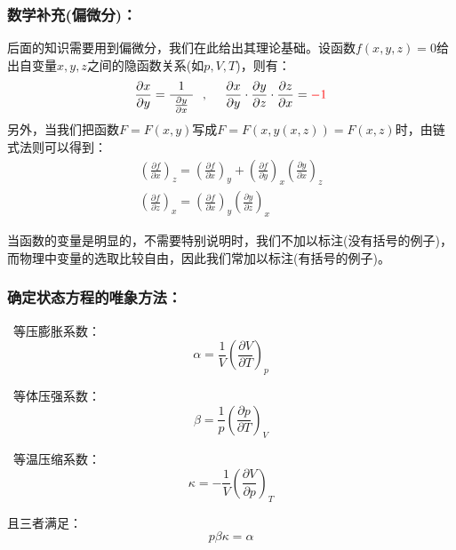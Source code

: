 \documentclass[zihao=5,UTF8]{report}
\begin{document}
\subsubsection{数学补充(偏微分)：}
后面的知识需要用到偏微分，我们在此给出其理论基础。设函数$f(x,y,z) = 0$给出自变量$x,y,z$之间的隐函数关系(如$p,V,T$)，则有：
\begin{align*}
    \frac{\partial x}{\partial y} = \frac{1}{\ \frac{\partial y}{\partial x} \ }\ \  ,\ \ \ \ 
    \frac{\partial x}{\partial y}\cdot \frac{\partial y}{\partial z}\cdot \frac{\partial z}{\partial x} = {\textcolor{red}{-1}}
\end{align*}
另外，当我们把函数$F = F(x,y)$写成$F = F(x,y(x,z)) = F(x,z)$时，由链式法则可以得到：
\begin{gather}
    \left(\frac{\partial f}{\partial x}\right)_z = \left(\frac{\partial f}{\partial x}\right)_y + \left(\frac{\partial f}{\partial y}\right)_x \left(\frac{\partial y}{\partial x}\right)_z \\
    \left(\frac{\partial f}{\partial z}\right)_x = \left(\frac{\partial f}{\partial x}\right)_y\left(\frac{\partial y}{\partial z}\right)_x
\end{gather}\par
{\color{gray}\small 当函数的变量是明显的，不需要特别说明时，我们不加以标注(没有括号的例子)，而物理中变量的选取比较自由，因此我们常加以标注(有括号的例子)。}
\subsubsection{确定状态方程的唯象方法：}
\ 等压膨胀系数：
\begin{equation}
    \alpha = \frac{1}{V} \left( \frac{\partial V}{\partial T}\right)_p
\end{equation}\par
{}\ 
等体压强系数：
\begin{equation}
    \beta = \frac{1}{p}\left( \frac{\partial p}{\partial T}\right)_V
\end{equation}\par
\ding{174}\ 等温压缩系数：
\begin{equation}
    \kappa  = -\frac{1}{V}\left(\frac{\partial V}{\partial p} \right)_T
\end{equation}\par
且三者满足：
\begin{equation}
    p\beta \kappa = \alpha
\end{equation}
\end{document}
